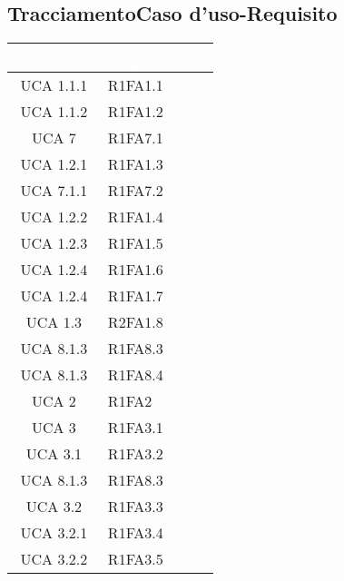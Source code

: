 \subsection{TracciamentoCaso d'uso-Requisito}
{
\renewcommand{\arraystretch}{1.5}
\centering
\begin{longtable}{ c C{4cm} c c}
\textcolor{white}{\textbf{Caso d'uso}} & \textcolor{white}{\textbf{Requisito}}\\	
\endhead


UCA 1.1.1 & R1FA1.1\\

UCA 1.1.2 & R1FA1.2\\

UCA 7 & R1FA7.1\\

UCA 1.2.1 & R1FA1.3\\

UCA 7.1.1 & R1FA7.2\\

UCA 1.2.2 & R1FA1.4\\

UCA 1.2.3 & R1FA1.5\\

UCA 1.2.4 & R1FA1.6\\

UCA 1.2.4 & R1FA1.7\\


UCA 1.3 & R2FA1.8\\

UCA 8.1.3 & R1FA8.3\\

UCA 8.1.3 & R1FA8.4\\

UCA 2 & R1FA2\\

UCA 3 & R1FA3.1\\

UCA 3.1 & R1FA3.2\\

UCA 8.1.3 & R1FA8.3\\

UCA 3.2 & R1FA3.3\\

UCA 3.2.1 & R1FA3.4\\


UCA 3.2.2 & R1FA3.5\\


\end{longtable}}
